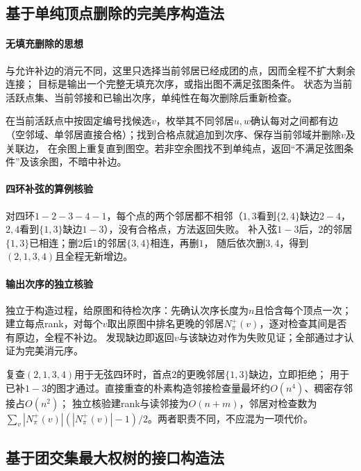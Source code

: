 \subsection{基于单纯顶点删除的完美序构造法}

\paragraph{无填充删除的思想}
与允许补边的消元不同，这里只选择当前邻居已经成团的点，因而全程不扩大剩余连接；
目标是输出一个完整无填充次序，或指出图不满足弦图条件。
状态为当前活跃点集、当前邻接和已输出次序，单纯性在每次删除后重新检查。

\begin{algorithm}[单纯顶点删除构造完美序]
  在当前活跃点中按固定编号找候选$v$，枚举其不同邻居$u,w$确认每对之间都有边
  （空邻域、单邻居直接合格）；找到合格点就追加到次序、保存当前邻域并删除$v$及关联边，
  在余图上重复直到图空。若非空余图找不到单纯点，返回“不满足弦图条件”及该余图，不暗中补边。
\end{algorithm}

\paragraph{四环补弦的算例核验}
对四环$1-2-3-4-1$，每个点的两个邻居都不相邻（$1,3$看到$\{2,4\}$缺边$2-4$，
$2,4$看到$\{1,3\}$缺边$1-3$），没有合格点，方法返回失败。
补入弦$1-3$后，$2$的邻居$\{1,3\}$已相连；删$2$后$1$的邻居$\{3,4\}$相连，再删$1$，
随后依次删$3,4$，得到$(2,1,3,4)$且全程无新增边。

\paragraph{输出次序的独立核验}
\begin{algorithm}[完美消元序核验]
  独立于构造过程，给原图和待检次序：先确认次序长度为$n$且恰含每个顶点一次；
  建立每点rank，对每个$v$取出原图中排名更晚的邻居$N^+_\pi(v)$，逐对检查其间是否有原边，全程不补边。
  发现缺边即返回$v$与该缺边对作为失败见证；全部通过才认证为完美消元序。
\end{algorithm}
复查$(2,1,3,4)$用于无弦四环时，首点$2$的更晚邻居$\{1,3\}$缺边，立即拒绝；
用于已补$1-3$的图才通过。直接重查的朴素构造邻接检查量最坏约$O(n^4)$、稠密存邻接占$O(n^2)$；
独立核验建rank与读邻接为$O(n+m)$，邻居对检查数为
$\sum_v|N^+_\pi(v)|(|N^+_\pi(v)|-1)/2$。两者职责不同，不应混为一项代价。

\subsection{基于团交集最大权树的接口构造法}

